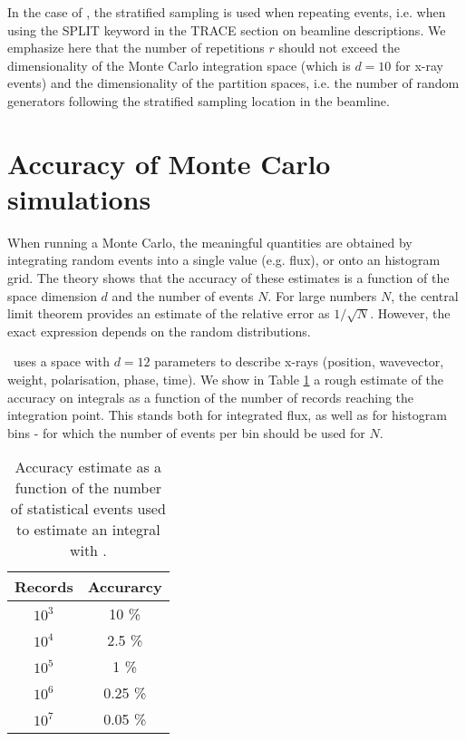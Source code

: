In the case of \MCX, the stratified sampling is used when repeating events, i.e. when using the SPLIT
keyword in the TRACE section on beamline descriptions. We emphasize here that
the number of repetitions $r$ should not exceed the dimensionality of the Monte
Carlo integration space (which is $d=10$ for x-ray events) and the
dimensionality of the partition spaces, i.e. the number of random generators
following the stratified sampling location in the beamline.

\section{Accuracy of Monte Carlo simulations}

When running a Monte Carlo, the meaningful quantities are obtained by
integrating random events into a single value (e.g. flux), or onto an histogram
grid. The theory \cite{James80} shows that the accuracy of these estimates is a
function of the space dimension $d$ and the number of events $N$. For large
numbers $N$, the central limit theorem provides an estimate of the relative
error as $1/\sqrt{N}$. However, the exact expression depends on the random
distributions.

\MCX\ uses a space with $d=12$ parameters to describe x-rays (position,
wavevector, weight, polarisation, phase, time). We show in Table \ref{t:mc_accuracy} a rough estimate of
the accuracy on integrals as a function of the number of records reaching the
integration point. This stands both for integrated flux, as well as for
histogram bins - for which the number of events per bin should be used for $N$.

\begin{table}
  \begin{center}
  {\let\my=\\
    \begin{tabular}{|c|c|}
    \hline
    Records       & Accurarcy \\
    \hline
    $10^3$ & 10 \% \\
    $10^4$ & 2.5 \% \\
    $10^5$ & 1 \% \\
    $10^6$ & 0.25 \% \\
    $10^7$ & 0.05 \% \\
    \hline
    \end{tabular}
    \caption{Accuracy estimate as a function of the number of statistical events used to estimate an integral with \MCX.}
    \label{t:mc_accuracy}
  }
  \end{center}
\end{table}

